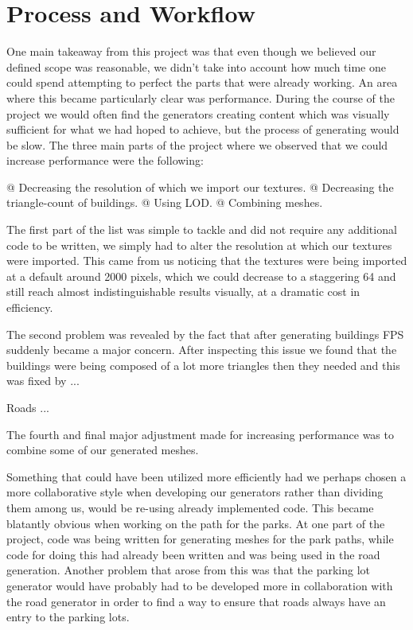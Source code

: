 \section{Process and Workflow}

One main takeaway from this project was that even though we believed our defined scope was reasonable, we didn't take into account how much time one could spend attempting to perfect the parts that were already working.
An area where this became particularly clear was performance.
During the course of the project we would often find the generators creating content which was visually sufficient for what we had hoped to achieve, but the process of generating would be slow. 
The three main parts of the project where we observed that we could increase performance were the following:

\begin{easylist}
  @ Decreasing the resolution of which we import our textures.
  @ Decreasing the triangle-count of buildings.
  @ Using LOD.
  @ Combining meshes. 
 \end{easylist}
 
The first part of the list was simple to tackle and did not require any additional code to be written, we simply had to alter the resolution at which our textures were imported.
This came from us noticing that the textures were being imported at a default around 2000 pixels, which we could decrease to a staggering 64 and still reach almost indistinguishable results visually, at a dramatic cost in efficiency. 

The second problem was revealed by the fact that after generating buildings FPS suddenly became a major concern. 
After inspecting this issue we found that the buildings were being composed of a lot more triangles then they needed and this was fixed by ...

Roads ... %

The fourth and final major adjustment made for increasing performance was to combine some of our generated meshes. 

Something that could have been utilized more efficiently had we perhaps chosen a more collaborative style when developing our generators rather than dividing them among us, would be re-using already implemented code. 
This became blatantly obvious when working on the path for the parks.
At one part of the project, code was being written for generating meshes for the park paths, while code for doing this had already been written and was being used in the road generation. 
Another problem that arose from this was that the parking lot generator would have probably had to be developed more in collaboration with the road generator in order to find a way to ensure that roads always have an entry to the parking lots.

